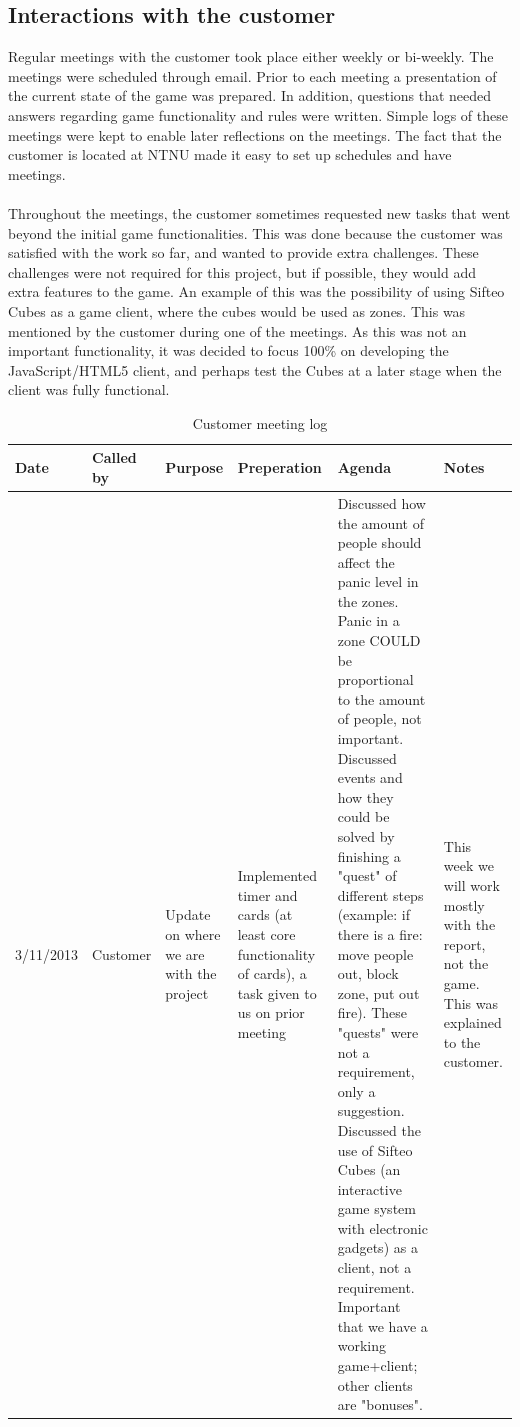 \subsection{Interactions with the customer}
Regular meetings with the customer took place either weekly or bi-weekly. The meetings were scheduled through email. Prior to each meeting a presentation of the current state of the game was prepared. In addition, questions that needed answers regarding game functionality and rules were written. Simple logs of these meetings were kept to enable later reflections on the meetings. The fact that the customer is located at NTNU made it easy to set up schedules and have meetings.\\
\\
Throughout the meetings, the customer sometimes requested new tasks that went beyond the initial game functionalities. This was done because the customer was satisfied with the work so far, and wanted to provide extra challenges. These challenges were not required for this project, but if possible, they would add extra features to the game. An example of this was the possibility of using Sifteo Cubes as a game client, where the cubes would be used as zones. This was mentioned by the customer during one of the meetings. As this was not an important functionality, it was decided to focus 100\% on developing the JavaScript/HTML5 client, and perhaps test the Cubes at a later stage when the client was fully functional.



\begin{table}[H]
{\scriptsize
\begin{tabular}{|p{1.9cm}|p{1.9cm}|p{1.9cm}|p{3cm}|p{3.5cm}|p{3.5cm}|}
\hline
	\textbf{Date} & \textbf{Called by} & \textbf{Purpose} & \textbf{Preperation}
	 	& \textbf{Agenda} & \textbf{Notes} 
\\ \hline
	3/11/2013 & Customer & Update on where we are with the project
		& Implemented timer and cards (at least core functionality of cards), 
a task given to us on prior meeting 
		& Discussed how the amount of people should affect the panic level in 
the zones. Panic in a zone COULD be proportional to the amount of people, not 
important. Discussed events and how they could be solved by finishing a "quest" 
of different steps (example: if there is a fire: move people out, block zone, 
put out fire). These "quests" were not a requirement, only a suggestion. 
Discussed the use of Sifteo Cubes (an interactive game system with electronic 
gadgets) as a client, not a requirement. Important that we have a working 
game+client; other clients are "bonuses". 
		& This week we will work mostly with the report, not the game. This was explained to the customer.
\\\hline
\end{tabular}
}
\caption{Customer meeting log}
\label{fig:CustomerMeetingLog}
\end{table}

